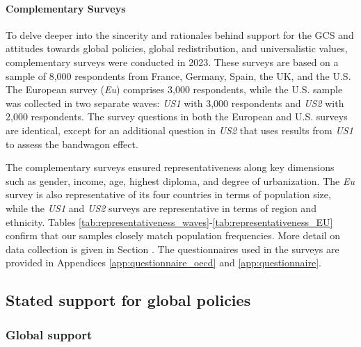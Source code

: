 \paragraph{Complementary Surveys}\label{par:surveys}

To delve deeper into the sincerity and rationales behind support for the GCS and attitudes towards global policies, global redistribution, and universalistic values, complementary surveys were conducted in 2023. These surveys are based on a sample of 8,000 respondents from France, Germany, Spain, the UK, and the U.S. The European survey (\textit{Eu}) comprises 3,000 respondents, while the U.S. sample was collected in two separate waves: \textit{US1} with 3,000 respondents and \textit{US2} with 2,000 respondents. The survey questions in both the European and U.S. surveys are identical, except for an additional question in \textit{US2} that uses results from \textit{US1} to assess the bandwagon effect.

The complementary surveys ensured representativeness along key dimensions such as gender, income, age, highest diploma, and degree of urbanization. The \textit{Eu} survey is also representative of its four countries in terms of population size, while the \textit{US1} and \textit{US2} surveys are representative in terms of region and ethnicity. Tables \ref{tab:representativeness_waves}-\ref{tab:representativeness_EU} confirm that our samples closely match population frequencies. More detail on data collection is given in Section . The questionnaires used in the surveys are provided in Appendices \ref{app:questionnaire_oecd} and \ref{app:questionnaire}.



\subsection{Stated support for global policies}\label{subsec:stated_support}


\subsubsection{Global support}\label{subsubsec:global_support}

